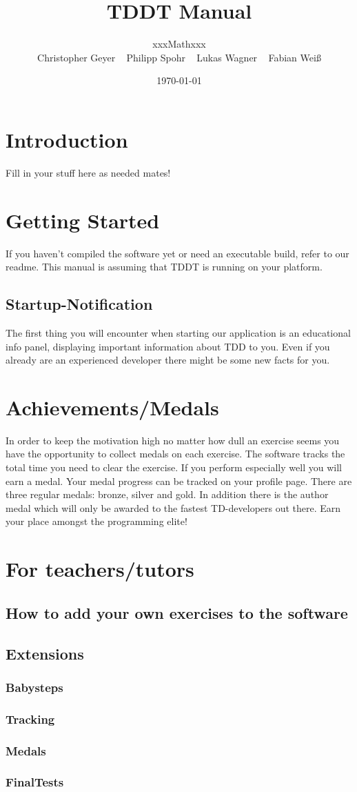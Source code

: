 \documentclass[10pt,a4paper]{article}
\begin{document}
\title{\large TDDT Manual}
\date{\small \today}
\author{\normalsize xxxMathxxx \\
Christopher Geyer ~
Philipp Spohr ~
Lukas Wagner ~
Fabian Weiß }
\maketitle
\tableofcontents
\section{Introduction}
Fill in your stuff here as needed mates!
\section{Getting Started}
If you haven't compiled the software yet or need an executable build, refer to our readme. This manual is assuming that TDDT is running on your platform.
\subsection{Startup-Notification}
The first thing you will encounter when starting our application is an educational info panel, displaying important information about TDD to you. Even if you already are an experienced developer there might be some new facts for you.
\section{Achievements/Medals}
In order to keep the motivation high no matter how dull an exercise seems you have the opportunity to
collect medals on each exercise. The software tracks the total time you need to clear the exercise. If you perform especially well you will earn
a medal. Your medal progress can be tracked on your profile page.
There are three regular medals: bronze, silver and gold. In addition there is the author medal which will only be awarded to the fastest TD-developers out there.
Earn your place amongst the programming elite!
\section{For teachers/tutors}
\subsection{How to add your own exercises to the software}
\subsection{Extensions}
\subsubsection{Babysteps}
\subsubsection{Tracking}
\subsubsection{Medals}
\subsubsection{FinalTests}
\end{document}
